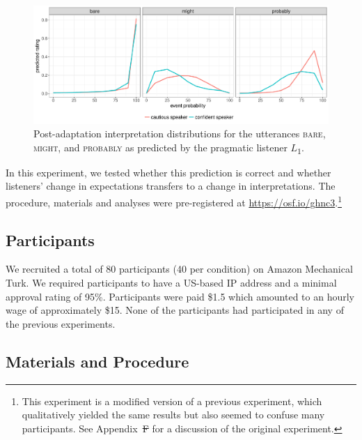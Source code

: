 \documentclass[man, floatsintext]{apa6}
\providecommand{\DIFadd}[1]{{\protect\color{blue}\uwave{#1}}} %
\providecommand{\DIFdel}[1]{{\protect\color{red}\sout{#1}}}                      %
\providecommand{\DIFaddbegin}{} %
\providecommand{\DIFaddend}{} %
\providecommand{\DIFdelbegin}{} %
\providecommand{\DIFdelend}{} %
\newcommand{\DIFscaledelfig}{0.5}
\newlength{\DIFdelgraphicswidth} %
\newlength{\DIFdelgraphicsheight} %
\newcommand{\DIFaddincludegraphics}[2][]{{\color{blue}\fbox{\DIFOincludegraphics[#1]{#2}}}} %
\newcommand{\DIFdelincludegraphics}[2][]{%
\sbox{\DIFdelgraphicsbox}{\DIFOincludegraphics[#1]{#2}}%
\settoboxwidth{\DIFdelgraphicswidth}{\DIFdelgraphicsbox} %
\settoboxtotalheight{\DIFdelgraphicsheight}{\DIFdelgraphicsbox} %
\scalebox{\DIFscaledelfig}{%
\parbox[b]{\DIFdelgraphicswidth}{\usebox{\DIFdelgraphicsbox}\\[-\baselineskip] \rule{\DIFdelgraphicswidth}{0em}}\llap{\resizebox{\DIFdelgraphicswidth}{\DIFdelgraphicsheight}{%
\setlength{\unitlength}{\DIFdelgraphicswidth}%
\begin{picture}(1,1)%
\thicklines\linethickness{2pt} %
{\color[rgb]{1,0,0}\put(0,0){\framebox(1,1){}}}%
{\color[rgb]{1,0,0}\put(0,0){\line( 1,1){1}}}%
{\color[rgb]{1,0,0}\put(0,1){\line(1,-1){1}}}%
\end{picture}%
}\hspace*{3pt}}} %
} %
\DeclareRobustCommand{\DIFaddbegin}{\DIFOaddbegin \let\includegraphics\DIFaddincludegraphics} %
\DeclareRobustCommand{\DIFaddend}{\DIFOaddend \let\includegraphics\DIFOincludegraphics} %
\DeclareRobustCommand{\DIFdelbegin}{\DIFOdelbegin \let\includegraphics\DIFdelincludegraphics} %
\DeclareRobustCommand{\DIFdelend}{\DIFOaddend \let\includegraphics\DIFOincludegraphics} %
\begin{document}
\begin{figure}
  \includegraphics[width=\textwidth]{plots/adaptation-posterior-comp.pdf}
  \caption{Post-adaptation interpretation distributions for the utterances  \textsc{bare}, \textsc{might}, and \textsc{probably} as predicted by the pragmatic listener $L$\textsubscript{$1$}. \label{fig:post-exposure-comp}}
\end{figure}

In this experiment, we tested whether this prediction is correct and whether listeners' change in expectations transfers to a change in interpretations. 
The procedure, materials and analyses were pre-registered at \url{https://osf.io/ghnc3}.\footnote{This experiment is a modified version of a previous experiment, which qualitatively yielded the same results but also seemed to confuse many participants. See Appendix~\DIFdelbegin \DIFdel{F }\DIFdelend \DIFaddbegin \DIFadd{G }\DIFaddend for a discussion of the original experiment.}

\subsection{Participants}

We recruited a total of 80 participants (40 per condition) on Amazon Mechanical Turk. We required participants to have a US-based IP address and a minimal approval rating of 95\%. Participants were paid \$1.5 which amounted to an hourly wage of approximately \$15. None of the participants had participated in any of the previous experiments. 

\subsection{Materials and Procedure}
\end{document}
